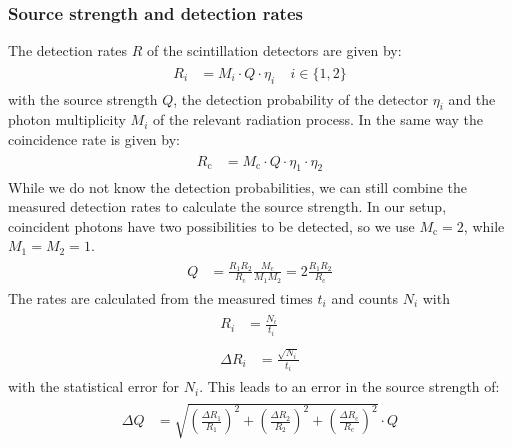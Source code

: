 \subsubsection*{Source strength and detection rates}
%
The detection rates $R$ of the scintillation detectors are given by:
%
\begin{align}
    \label{eq:DetectionRates}
    \begin{split}
        R_i &= M_i \cdot Q \cdot \eta_i ~~~~~ i \in \{1,2\}
    \end{split}
\end{align}
%
with the source strength $Q$, the detection probability of the detector $\eta_i$ and the photon multiplicity $M_i$ of the relevant radiation process.
In the same way the coincidence rate is given by:
%
\begin{align}
    \label{eq:CoincidenceDetectionRates}
    \begin{split}
        R_{\text{c}} &= M_{\text{c}} \cdot Q \cdot \eta_1 \cdot \eta_2
    \end{split}
\end{align}
%
While we do not know the detection probabilities, we can still combine the measured detection rates to calculate the source strength.
In our setup, coincident photons have two possibilities to be detected, so we use $M_{\text{c}} = 2$, while $M_1 = M_2 = 1$.
%
\begin{align}
    \label{eq:SourceStrength}
    \begin{split}
        Q &= \frac{R_1 R_2}{R_{\text{c}}} \frac{ M_{\text{c}}}{M_1 M_2} = 2 \frac{R_1 R_2}{R_{\text{c}}}
    \end{split}
\end{align}
%
The rates are calculated from the measured times $t_i$ and counts $N_i$ with
%
\begin{align}
    \label{eq:RateMeasured}
    \begin{split}
        R_i  &= \frac{N_i}{t_i}
    \end{split}
    \\
    \label{eq:DeltaRateMeasured}
    \begin{split}
        \Delta R_i &= \frac{\sqrt{N_i}}{t_i}
    \end{split}
\end{align}
%
with the statistical error for $N_i$.
This leads to an error in the source strength of:
%
\begin{align}
    \label{eq:DeltaSourceStrength}
    \begin{split}
        \Delta Q &= \sqrt{ \left ( \frac{\Delta R_1}{R_1} \right ) ^2 +
                           \left ( \frac{\Delta R_2}{R_2} \right ) ^2 +
                           \left ( \frac{\Delta R_{\text{c}}}{R_{\text{c}}} \right ) ^2 } \cdot Q
    \end{split}
\end{align}
